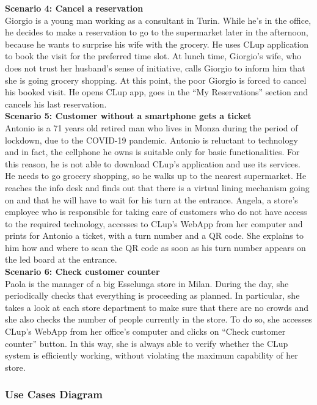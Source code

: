 \documentclass{article}
\begin{document}
\medskip
\textbf{Scenario 4: Cancel a reservation}\medskip\\
Giorgio is a young man working as a consultant in Turin. While he’s in the office, he decides to make a reservation to go to the supermarket later in the afternoon, because he wants to surprise his wife with the grocery. He uses CLup application to book the visit for the preferred time slot. At lunch time, Giorgio’s wife, who does not trust her husband’s sense of initiative, calls Giorgio to inform him that she is going grocery shopping. At this point, the poor Giorgio is forced to cancel his booked visit. He opens CLup app, goes in the “My Reservations” section and cancels his last reservation.\medskip\\
\medskip
\textbf{Scenario 5: Customer without a smartphone gets a ticket}\medskip\\
Antonio is a 71 years old retired man who lives in Monza during the period of lockdown, due to the COVID-19 pandemic. Antonio is reluctant to technology and in fact, the cellphone he owns is suitable only for basic functionalities. For this reason, he is not able to download CLup’s application and use its services. He needs to go grocery shopping, so he walks up to the nearest supermarket. He reaches the info desk and finds out that there is a virtual lining mechanism going on and that he will have to wait for his turn at the entrance. Angela, a store’s employee who is responsible for taking care of customers who do not have access to the required technology, accesses to CLup’s WebApp from her computer and prints for Antonio a ticket, with a turn number and a QR code. She explains to him how and where to scan the QR code as soon as his turn number appears on the led board at the entrance.\medskip\\
\medskip
\textbf{Scenario 6: Check customer counter}\medskip\\
Paola is the manager of a big Esselunga store in Milan. During the day, she periodically checks that everything is proceeding as planned. In particular, she takes a look at each store department to make sure that there are no crowds and she also checks the number of people currently in the store. To do so, she accesses CLup’s WebApp from her office’s computer and clicks on “Check customer counter” button. In this way, she is always able to verify whether the CLup system is efficiently working, without violating the maximum capability of her store.\medskip\\

\subsubsection{Use Cases Diagram}
\end{document}
